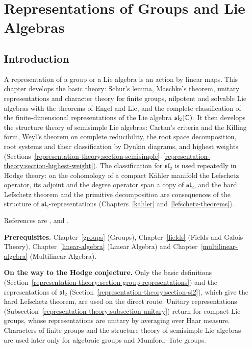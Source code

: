 \chapter{Representations of Groups and Lie Algebras}\label{representation-theory}

\section{Introduction}\label{representation-theory:section-introduction}

A representation of a group or a Lie algebra is an action by linear maps. This chapter develops the
basic theory: Schur's lemma, Maschke's theorem, unitary representations and character theory for finite groups, nilpotent and solvable Lie algebras with the
theorems of Engel and Lie, and the complete
classification of the finite-dimensional representations of the Lie algebra $\mathfrak{sl}_2(\mathbb{C})$. It then develops the structure theory of semisimple Lie
algebras: Cartan's criteria and the Killing form, Weyl's theorem on complete reducibility, the root space decomposition, root systems and their classification by
Dynkin diagrams, and highest weights (Sections~\ref{representation-theory:section-semisimple}--\ref{representation-theory:section-highest-weight}). The classification for
$\mathfrak{sl}_2$ is used repeatedly in Hodge theory: on the cohomology of a compact K\"ahler manifold the
Lefschetz operator, its adjoint and the degree operator span a copy of $\mathfrak{sl}_2$, and the hard
Lefschetz theorem and the primitive decomposition are consequences of the structure of
$\mathfrak{sl}_2$-representations (Chapters~\ref{kahler} and~\ref{lefschetz-theorems}).

References are \cite{serre-linear-representations}, \cite{fulton-harris} and \cite{humphreys-lie}.

\noindent\textbf{Prerequisites.} Chapter~\ref{groups} (Groups), Chapter~\ref{fields} (Fields and Galois
Theory), Chapter~\ref{linear-algebra} (Linear Algebra) and Chapter~\ref{multilinear-algebra}
(Multilinear Algebra).

\noindent\textbf{On the way to the Hodge conjecture.} Only the basic definitions (Section~\ref{representation-theory:section-group-representations}) and the representations of $\mathfrak{sl}_2$ (Section~\ref{representation-theory:section-sl2}), which give the hard
Lefschetz theorem, are used on the direct route. Unitary representations (Subsection~\ref{representation-theory:subsection-unitary}) return for compact Lie groups, whose
representations are unitary by averaging over Haar measure. Characters of finite groups and the structure theory of semisimple Lie algebras are used later only for algebraic groups and
Mumford--Tate groups.

